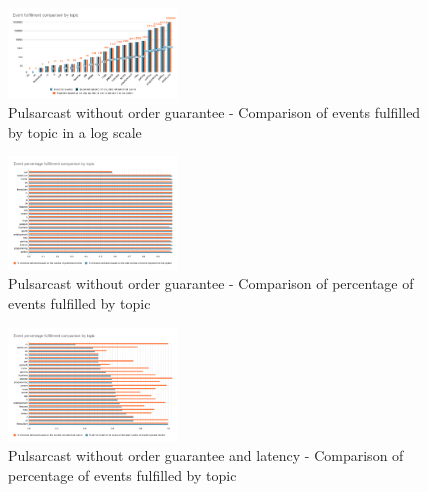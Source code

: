 \begin{figure}[!htb]
  \centering
  \includegraphics[width=0.4\textwidth]{img/graph-pulsarcast-event-fulfillment-comparison.png}
  \caption{Pulsarcast without order guarantee - Comparison of events fulfilled by topic in a log scale}
  \label{fig:graph-pulsarcast-event-fulfillment-comparison}
\end{figure}

\begin{figure}[!htb]
  \centering
  \includegraphics[width=0.4\textwidth]{img/graph-pulsarcast-event-percentage-fulfillment-comparison.png}
  \caption{Pulsarcast without order guarantee - Comparison of percentage of events fulfilled by topic}
  \label{fig:graph-pulsarcast-event-percentage-fulfillment-comparison}
\end{figure}

\begin{figure}[!htb]
  \centering
  \includegraphics[width=0.4\textwidth]{img/graph-pulsarcast-latency-event-percentage-fulfillment-comparison.png}
  \caption{Pulsarcast without order guarantee and latency - Comparison of percentage of events fulfilled by topic}
  \label{fig:graph-pulsarcast-latency-event-percentage-fulfillment-comparison}
\end{figure}

